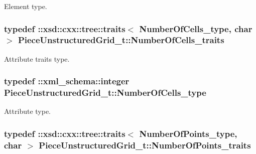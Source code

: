 Element type. 

\hypertarget{classPieceUnstructuredGrid__t_a7c7607d306bde9e187b9cb3f570d6155}{}
\subsubsection[{Number\+Of\+Cells\+\_\+traits}]{\setlength{\rightskip}{0pt plus 5cm}typedef \+::xsd\+::cxx\+::tree\+::traits$<$ {\bf Number\+Of\+Cells\+\_\+type}, char $>$ {\bf Piece\+Unstructured\+Grid\+\_\+t\+::\+Number\+Of\+Cells\+\_\+traits}}\label{classPieceUnstructuredGrid__t_a7c7607d306bde9e187b9cb3f570d6155}


Attribute traits type. 

\hypertarget{classPieceUnstructuredGrid__t_aeae5546900c50a4abe9b3aea485e97d0}{}
\subsubsection[{Number\+Of\+Cells\+\_\+type}]{\setlength{\rightskip}{0pt plus 5cm}typedef \+::{\bf xml\+\_\+schema\+::integer} {\bf Piece\+Unstructured\+Grid\+\_\+t\+::\+Number\+Of\+Cells\+\_\+type}}\label{classPieceUnstructuredGrid__t_aeae5546900c50a4abe9b3aea485e97d0}


Attribute type. 

\hypertarget{classPieceUnstructuredGrid__t_acdfbb1dc264a5a48bcc6d4aa815db003}{}
\subsubsection[{Number\+Of\+Points\+\_\+traits}]{\setlength{\rightskip}{0pt plus 5cm}typedef \+::xsd\+::cxx\+::tree\+::traits$<$ {\bf Number\+Of\+Points\+\_\+type}, char $>$ {\bf Piece\+Unstructured\+Grid\+\_\+t\+::\+Number\+Of\+Points\+\_\+traits}}\label{classPieceUnstructuredGrid__t_acdfbb1dc264a5a48bcc6d4aa815db003}


